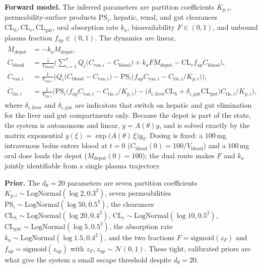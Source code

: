 \textbf{Forward model.} The inferred parameters are partition coefficients $K_{p,i}$,
permeability-surface products $\mathrm{PS}_i$, hepatic, renal, and gut clearances
$\mathrm{CL}_h,\mathrm{CL}_r,\mathrm{CL}_{\mathrm{gut}}$, oral absorption rate $k_a$,
bioavailability $F\in(0,1)$, and unbound plasma fraction $f_{up}\in(0,1)$. The dynamics
are linear,
\begin{align*}
\dot M_{\mathrm{depot}} &= -k_a M_{\mathrm{depot}},\\
\dot C_{\mathrm{blood}} &= \frac{1}{V_{\mathrm{blood}}}\Big(\textstyle\sum_{i=1}^7 Q_i\big(C_{\mathrm{vas},i}-C_{\mathrm{blood}}\big)+k_a F M_{\mathrm{depot}}-\mathrm{CL}_r f_{up}C_{\mathrm{blood}}\Big),\\
\dot C_{\mathrm{vas},i} &= \frac{1}{V_{\mathrm{vas},i}}\Big(Q_i\big(C_{\mathrm{blood}}-C_{\mathrm{vas},i}\big)-\mathrm{PS}_i\big(f_{up}C_{\mathrm{vas},i}-C_{\mathrm{tis},i}/K_{p,i}\big)\Big),\\
\dot C_{\mathrm{tis},i} &= \frac{1}{V_{\mathrm{tis},i}}\Big(\mathrm{PS}_i\big(f_{up}C_{\mathrm{vas},i}-C_{\mathrm{tis},i}/K_{p,i}\big)-\big(\delta_{i,\mathrm{liver}}\mathrm{CL}_h+\delta_{i,\mathrm{gut}}\mathrm{CL}_{\mathrm{gut}}\big)C_{\mathrm{tis},i}/K_{p,i}\Big),
\end{align*}
where $\delta_{i,\mathrm{liver}}$ and $\delta_{i,\mathrm{gut}}$ are indicators that switch
on hepatic and gut elimination for the liver and gut compartments only. Because the depot
is part of the state, the system is autonomous and linear, $\dot y=A(\theta)y$, and is
solved exactly by the matrix exponential $y(\xi)=\exp\!\big(A(\theta)\,\xi\big)y_0$.
Dosing is fixed: a $100$\,mg intravenous bolus enters blood at $t=0$
($C_{\mathrm{blood}}(0)=100/V_{\mathrm{blood}}$) and a $100$\,mg oral dose loads the depot
($M_{\mathrm{depot}}(0)=100$); the dual route makes $F$ and $k_a$ jointly identifiable
from a single plasma trajectory.

\textbf{Prior.} The $d_\theta=20$ parameters are seven partition coefficients
$K_{p,i}\sim\mathrm{LogNormal}(\log 2,0.3^2)$, seven permeabilities
$\mathrm{PS}_i\sim\mathrm{LogNormal}(\log 50,0.5^2)$, the clearances
$\mathrm{CL}_h\sim\mathrm{LogNormal}(\log 20,0.4^2)$,
$\mathrm{CL}_r\sim\mathrm{LogNormal}(\log 10,0.5^2)$,
$\mathrm{CL}_{\mathrm{gut}}\sim\mathrm{LogNormal}(\log 5,0.5^2)$, the absorption rate
$k_a\sim\mathrm{LogNormal}(\log 1.5,0.4^2)$, and the two fractions $F=\mathrm{sigmoid}(z_F)$
and $f_{up}=\mathrm{sigmoid}(z_{up})$ with $z_F,z_{up}\sim\mathcal N(0,1)$. These tight,
calibrated priors are what give the system a small escape threshold despite $d_\theta=20$.

